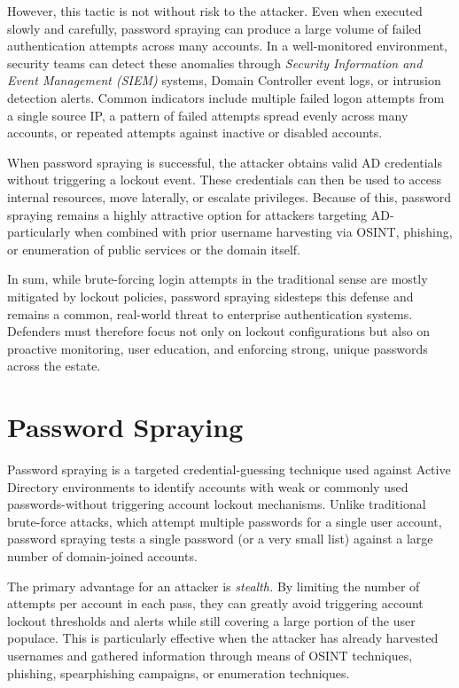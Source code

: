 However, this tactic is not without risk to the attacker. Even when executed slowly and carefully, password spraying can produce a large volume of failed authentication attempts across many accounts. In a well-monitored environment, security teams can detect these anomalies through \textit{Security Information and Event Management (SIEM)} systems, Domain Controller event logs, or intrusion detection alerts. Common indicators include multiple failed logon attempts from a single source IP, a pattern of failed attempts spread evenly across many accounts, or repeated attempts against inactive or disabled accounts.

When password spraying is successful, the attacker obtains valid AD credentials without triggering a lockout event. These credentials can then be used to access internal resources, move laterally, or escalate privileges. Because of this, password spraying remains a highly attractive option for attackers targeting AD-particularly when combined with prior username harvesting via OSINT, phishing, or enumeration of public services or the domain itself.

In sum, while brute-forcing login attempts in the traditional sense are mostly mitigated by lockout policies, password spraying sidesteps this defense and remains a common, real-world threat to enterprise authentication systems. Defenders must therefore focus not only on lockout configurations but also on proactive monitoring, user education, and enforcing strong, unique passwords across the estate.

\section{Password Spraying}
Password spraying is a targeted credential-guessing technique used against Active Directory environments to identify accounts with weak or commonly used passwords-without triggering account lockout mechanisms. Unlike traditional brute-force attacks, which attempt multiple passwords for a single user account, password spraying tests a single password (or a very small list) against a large number of domain-joined accounts.

The primary advantage for an attacker is \textit{stealth.} By limiting the number of attempts per account in each pass, they can greatly avoid triggering account lockout thresholds and alerts while still covering a large portion of the user populace. This is particularly effective when the attacker has already harvested usernames and gathered information through means of OSINT techniques, phishing, spearphishing campaigns, or enumeration techniques.

